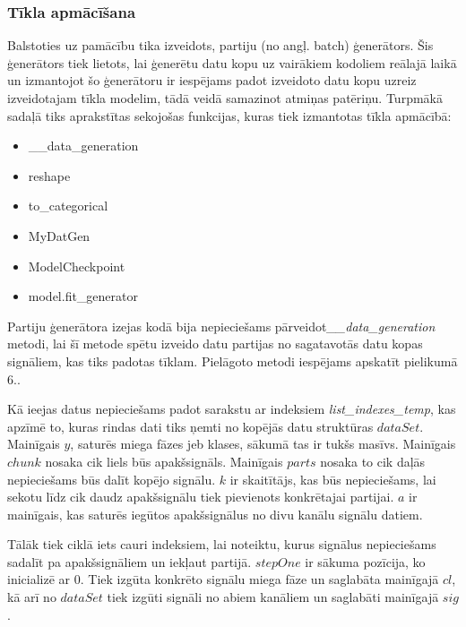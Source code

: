 \documentclass[12pt,paper=A4]{report}
\begin{document}

    

\subsubsection{Tīkla apmācīšana}  
  
Balstoties uz pamācību \cite{tutoriA} tika izveidots, partiju (no angļ. batch) ģenerātors. Šis ģenerātors tiek lietots, lai ģenerētu datu kopu uz vairākiem kodoliem reālajā laikā un izmantojot šo ģenerātoru ir iespējams padot izveidoto datu kopu uzreiz izveidotajam tīkla modelim, tādā veidā samazinot atmiņas patēriņu. Turpmākā sadaļā tiks aprakstītas sekojošas funkcijas, kuras tiek izmantotas tīkla apmācībā:

\begin{itemize}
\item __data_generation
\item reshape
\item to_categorical
\item MyDatGen
\item ModelCheckpoint
\item model.fit_generator
\end{itemize}


Partiju ģenerātora izejas kodā bija nepieciešams pārveidot\textit{__data_generation} metodi, lai šī metode spētu izveido datu partijas no sagatavotās datu kopas signāliem, kas tiks padotas tīklam.
Pielāgoto metodi iespējams apskatīt pielikumā 6.. 

Kā ieejas datus nepieciešams padot sarakstu ar indeksiem \textit{list_indexes_temp}, kas apzīmē to, kuras rindas dati tiks ņemti no kopējās datu struktūras $dataSet$. Mainīgais $y$, saturēs miega fāzes jeb klases, sākumā tas ir tukšs masīvs. Mainīgais $chunk$ nosaka cik liels būs apakšsignāls. Mainīgais $parts$ nosaka to cik daļās nepieciešams būs dalīt kopējo signālu. $k$ ir skaitītājs, kas būs nepieciešams, lai sekotu līdz cik daudz apakšsignālu tiek pievienots konkrētajai partijai. $a$ ir mainīgais, kas saturēs iegūtos apakšsignālus no divu kanālu signālu datiem. 

Tālāk tiek ciklā iets cauri indeksiem, lai noteiktu, kurus signālus nepieciešams sadalīt pa apakšsignāliem un iekļaut partijā. $stepOne$ ir sākuma pozīcija, ko inicializē ar $0$. Tiek izgūta konkrēto signālu miega fāze un saglabāta mainīgajā $cl$, kā arī no $dataSet$ tiek izgūti signāli no abiem kanāliem un saglabāti mainīgajā $sig$. 
\end{document}
